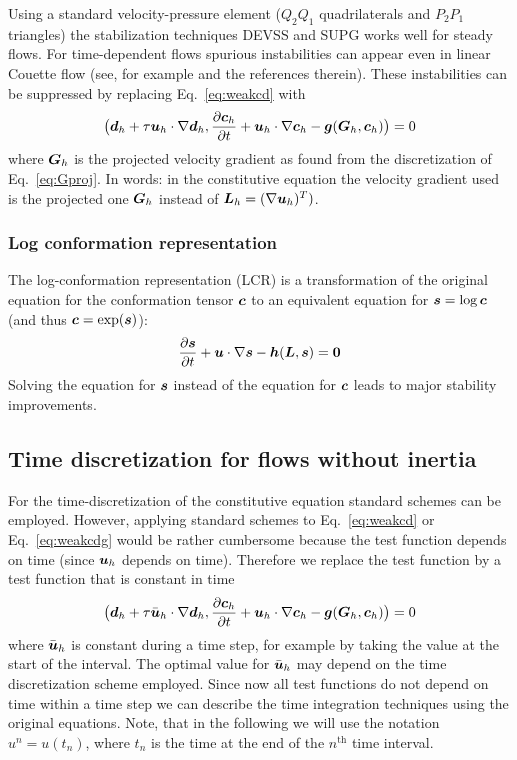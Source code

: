 Using a standard velocity-pressure element ($Q_2Q_1$
quadrilaterals and $P_2P_1$ triangles) the
stabilization techniques DEVSS and SUPG works well for steady flows. For
time-dependent flows spurious instabilities can appear even in linear Couette
flow (see, for example \cite{Bogaerds00} and the references therein). These
instabilities can be suppressed by replacing Eq.~\eqref{eq:weakcd} with
\begin{equation}
 \big(\boldsymbol{d}_h+\tau\boldsymbol{u}_h\cdot\nabla \boldsymbol{d}_h,\dfrac{\partial \boldsymbol{c}_h}{\partial t}
+\boldsymbol{u}_h\cdot\nabla\boldsymbol{c}_h-\boldsymbol{g}(\boldsymbol{G}_h,\boldsymbol{c}_h)\big)= 0
\label{eq:weakcdg}
\end{equation}
where $\boldsymbol{G}_h$ is the projected velocity gradient as found from the
discretization of Eq.~\eqref{eq:Gproj}. In words: in the constitutive
equation the velocity gradient used is the projected one $\boldsymbol{G}_h$ instead of
 $\boldsymbol{L}_h=(\nabla\boldsymbol{u}_h)^T)$.

\subsubsection{Log conformation representation}

The log-conformation representation (LCR) \cite{Hulsen05}
is a transformation of the original
equation for the conformation tensor $\boldsymbol{c}$ to an equivalent equation for
$\boldsymbol{s}=\log\boldsymbol{c}$ (and thus $\boldsymbol{c}=\exp(\boldsymbol{s})$):
\begin{equation}
 \dfrac{\partial \boldsymbol{s}}{\partial t} +\boldsymbol{u}\cdot\nabla\boldsymbol{s}-\boldsymbol{h}(\boldsymbol{L},\boldsymbol{s})= \boldsymbol{0}
  \label{eq:LCR}
\end{equation}
Solving the equation for $\boldsymbol{s}$ instead of the equation for $\boldsymbol{c}$ leads to
major stability improvements.

\subsection{Time discretization for flows without inertia}

For the time-discretization of the constitutive equation standard schemes can
be employed.
However, applying standard schemes to Eq.~\eqref{eq:weakcd} or
Eq.~\eqref{eq:weakcdg} would be rather cumbersome because the test
function depends on time (since $\boldsymbol{u}_h$ depends on time).
Therefore we replace the
test function by a test function that is constant in time
\begin{equation}
 \big(\boldsymbol{d}_h+\tau\bar{\boldsymbol{u}}_h\cdot\nabla \boldsymbol{d}_h,\dfrac{\partial \boldsymbol{c}_h}{\partial t}
+\boldsymbol{u}_h\cdot\nabla\boldsymbol{c}_h-\boldsymbol{g}(\boldsymbol{G}_h,\boldsymbol{c}_h)\big)= 0
\label{eq:weakcdgc}
\end{equation}
where $\bar{\boldsymbol{u}}_h$ is constant during a time step, for example by taking
the value at the start of the interval.
The optimal value for $\bar{\boldsymbol{u}}_h$ may depend
on the time discretization scheme employed. Since now all test functions do not
depend on time within a time step we can describe the time integration
techniques using the original equations.
Note, that in the following we will 
use the notation $u^{n}=u(t_n)$, where $t_n$ is the time at the
end of the $n^\text{th}$ time interval.

